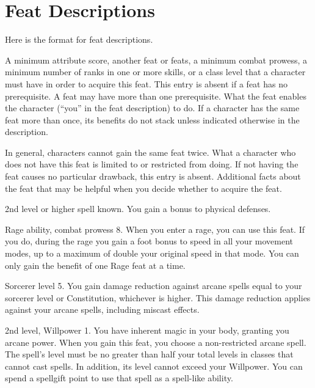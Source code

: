 \twocolumn

\section{Feat Descriptions}
Here is the format for feat descriptions.

\featpre A minimum attribute score, another feat or feats, a minimum combat prowess, a minimum number of ranks in one or more skills, or a class level that a character must have in order to acquire this feat.
This entry is absent if a feat has no prerequisite.
A feat may have more than one prerequisite.
\featben What the feat enables the character (``you'' in the feat description) to do.
If a character has the same feat more than once, its benefits do not stack unless indicated otherwise in the description.
\par In general, characters cannot gain the same feat twice.
What a character who does not have this feat is limited to or restricted from doing.
If not having the feat causes no particular drawback, this entry is absent.
Additional facts about the feat that may be helpful when you decide whether to acquire the feat.

\featpre 2nd level or higher  spell known.
\featben You gain a  bonus to physical defenses.

\featpres Rage ability, combat prowess 8.
\featben When you enter a rage, you can use this feat. If you do, during the rage you gain a  foot bonus to speed in all your movement modes, up to a maximum of double your original speed in that mode.
 You can only gain the benefit of one Rage feat at a time.

\featpre Sorcerer level 5.
\featben You gain damage reduction against arcane spells equal to your sorcerer level or Constitution, whichever is higher.
This damage reduction applies against your arcane spells, including miscast effects.

\featpres 2nd level, Willpower 1.
\featben You have inherent magic in your body, granting you arcane power.
When you gain this feat, you choose a non-restricted arcane spell.
The spell's level must be no greater than half your total levels in classes that cannot cast spells.
In addition, its level cannot exceed your Willpower.
You can spend a spellgift point to use that spell as a spell-like ability.

